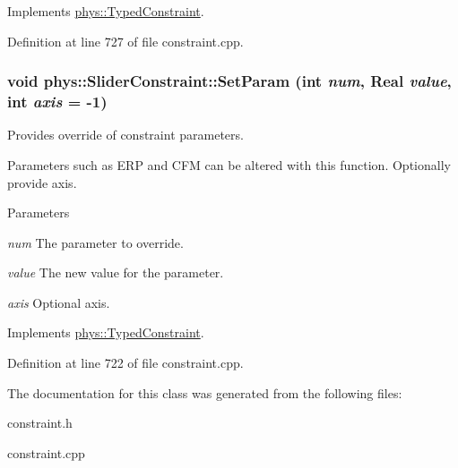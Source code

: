 Implements \hyperlink{classphys_1_1TypedConstraint_ab6140d40e9476c3dc46e2802e8097421}{phys::TypedConstraint}.



Definition at line 727 of file constraint.cpp.

\hypertarget{classphys_1_1SliderConstraint_a1516aeff86674a969411b17a1847d115}{
\subsubsection[{SetParam}]{\setlength{\rightskip}{0pt plus 5cm}void phys::SliderConstraint::SetParam (int {\em num}, \/  {\bf Real} {\em value}, \/  int {\em axis} = {\ttfamily -\/1})}}
\label{dc/d72/classphys_1_1SliderConstraint_a1516aeff86674a969411b17a1847d115}


Provides override of constraint parameters. 

Parameters such as ERP and CFM can be altered with this function. Optionally provide axis. 
\begin{DoxyParams}{Parameters}
\item[{\em num}]The parameter to override. \item[{\em value}]The new value for the parameter. \item[{\em axis}]Optional axis. \end{DoxyParams}


Implements \hyperlink{classphys_1_1TypedConstraint_a31a20a74094f0cb8e4f82d1f99725415}{phys::TypedConstraint}.



Definition at line 722 of file constraint.cpp.



The documentation for this class was generated from the following files:\begin{DoxyCompactItemize}
\item 
constraint.h\item 
constraint.cpp\end{DoxyCompactItemize}
